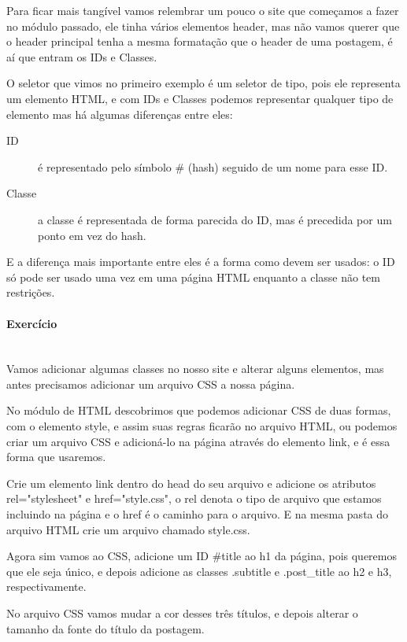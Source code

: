 \documentclass[12pt,a4paper]{article}
\begin{document}
	Para ficar mais tangível vamos relembrar um pouco o site que começamos a fazer no módulo passado, ele tinha vários elementos header, mas não vamos querer que o header principal tenha a mesma formatação que o header de uma postagem, é aí que entram os IDs e Classes.
	
	O seletor que vimos no primeiro exemplo é um seletor de tipo, pois ele representa um elemento HTML, e com IDs e Classes podemos representar qualquer tipo de elemento mas há algumas diferenças entre eles:
	
	\begin{description}
		\item[ID] é representado pelo símbolo \# (hash) seguido de um nome para esse ID.
		
		\item[Classe] a classe é representada de forma parecida do ID, mas é precedida por um ponto em vez do hash.
	\end{description} 
	
	E a diferença mais importante entre eles é a forma como devem ser usados: o ID só pode ser usado uma vez em uma página HTML enquanto a classe não tem restrições.
	
	\paragraph{Exercício} \mbox{} \\
	
	Vamos adicionar algumas classes no nosso site e alterar alguns elementos, mas antes precisamos adicionar um arquivo CSS a nossa página.
	
	No módulo de HTML descobrimos que podemos adicionar CSS de duas formas, com o elemento style, e assim suas regras ficarão no arquivo HTML, ou podemos criar um arquivo CSS e adicioná-lo na página através do elemento link, e é essa forma que usaremos.
	
	Crie um elemento link dentro do head do seu arquivo e adicione os atributos rel="stylesheet" e href="style.css", o rel denota o tipo de arquivo que estamos incluindo na página e o href é o caminho para o arquivo. E na mesma pasta do arquivo HTML crie um arquivo chamado style.css.
	
	Agora sim vamos ao CSS, adicione um ID \#title ao h1 da página, pois queremos que ele seja único, e depois adicione as classes .subtitle e .post\_title ao h2 e h3, respectivamente.
	
	No arquivo CSS vamos mudar a cor desses três títulos, e depois alterar o tamanho da fonte do título da postagem.
	
\end{document}
